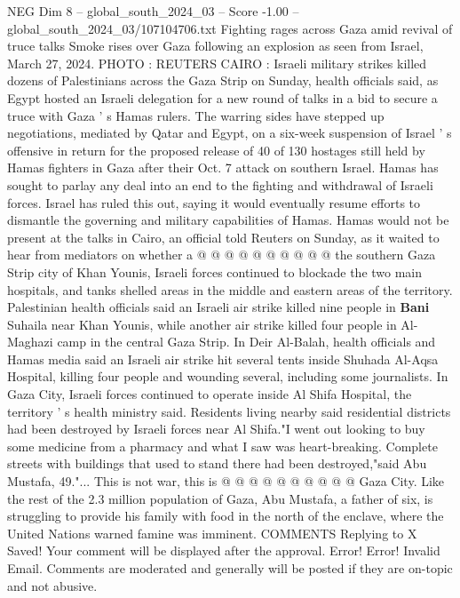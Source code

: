 \begin{textsample}{NEG Dim 8 – global\_south\_2024\_03 – Score -1.00 – global\_south\_2024\_03/107104706.txt}  \label{ex:f8_neg_362}
Fighting rages across Gaza amid revival of truce talks Smoke rises over Gaza following an explosion as seen from Israel, March 27, 2024.
PHOTO : REUTERS CAIRO : Israeli military strikes killed dozens of Palestinians across the Gaza Strip on Sunday, health officials said, as Egypt hosted an Israeli delegation for a new round of talks in a bid to secure a truce with Gaza ' s Hamas rulers.
The warring sides have stepped up negotiations, mediated by Qatar and Egypt, on a six-week suspension of Israel ' s offensive in return for the proposed release of 40 of 130 hostages still held by Hamas fighters in Gaza after their Oct. 7 attack on southern Israel.
Hamas has sought to parlay any deal into an end to the fighting and withdrawal of Israeli forces.
Israel has ruled this out, saying it would eventually resume efforts to dismantle the governing and military capabilities of Hamas.
Hamas would not be present at the talks in Cairo, an official told Reuters on Sunday, as it waited to hear from mediators on whether a @ @ @ @ @ @ @ @ @ @ the southern Gaza Strip city of Khan Younis, Israeli forces continued to blockade the two main hospitals, and tanks shelled areas in the middle and eastern areas of the territory.
Palestinian health officials said an Israeli air strike killed nine people in \textbf{Bani} Suhaila near Khan Younis, while another air strike killed four people in Al-Maghazi camp in the central Gaza Strip.
In Deir Al-Balah, health officials and Hamas media said an Israeli air strike hit several tents inside Shuhada Al-Aqsa Hospital, killing four people and wounding several, including some journalists.
In Gaza City, Israeli forces continued to operate inside Al Shifa Hospital, the territory ' s health ministry said.
Residents living nearby said residential districts had been destroyed by Israeli forces near Al Shifa."I went out looking to buy some medicine from a pharmacy and what I saw was heart-breaking.
Complete streets with buildings that used to stand there had been destroyed,"said Abu Mustafa, 49."...
This is not war, this is @ @ @ @ @ @ @ @ @ @ Gaza City.
Like the rest of the 2.3 million population of Gaza, Abu Mustafa, a father of six, is struggling to provide his family with food in the north of the enclave, where the United Nations warned famine was imminent.
COMMENTS Replying to X Saved!
Your comment will be displayed after the approval.
Error!
Error!
Invalid Email.
Comments are moderated and generally will be posted if they are on-topic and not abusive.

\end{textsample}
